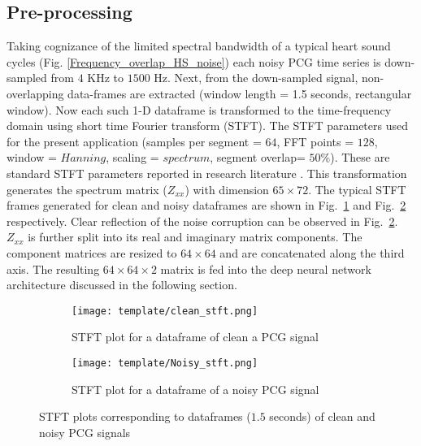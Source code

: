 \documentclass[sigconf,screen]{acmart}
\begin{document}
\subsection{Pre-processing}
Taking cognizance of the limited spectral bandwidth of a typical heart sound cycles (Fig. \ref{Frequency_overlap_HS_noise}) each noisy PCG time series is down-sampled from $4$ KHz to $1500$ Hz. Next, from the down-sampled signal, non-overlapping data-frames are extracted (window length = 1.5 seconds, rectangular window). Now each such 1-D dataframe is transformed to the time-frequency domain using short time Fourier transform (STFT). The STFT parameters used for the present application (samples per segment = $64$, FFT points = $128$, window = $Hanning$, scaling  = $spectrum$, segment overlap= $50\%$). These are standard STFT parameters reported in research literature \cite{grais2017two}.  This transformation generates the spectrum matrix ($Z_{xx}$) with dimension $65\times72$. The typical STFT frames generated for clean and noisy dataframes are shown in Fig.~\ref{fig:clean_stft.png} and Fig.~\ref{fig:Noisy_stft.png} respectively. Clear reflection of the noise corruption can be observed in Fig.~\ref{fig:Noisy_stft.png}. $Z_{xx}$ is further split into its real and imaginary matrix components. The component matrices are resized to $64\times64$  and are concatenated along the third axis. The resulting $64\times64\times2$ matrix is fed into the deep neural network architecture discussed in the following section. 
\begin{figure}
	\begin{subfigure}{.45\textwidth}
		\centering
		\texttt{[image: template/clean\_stft.png]}
		\caption{STFT plot for a dataframe of clean a PCG signal}
		\label{fig:clean_stft.png}
	\end{subfigure}
	\begin{subfigure}{.45\textwidth}
		\centering
		\texttt{[image: template/Noisy\_stft.png]}
		\caption{STFT plot for a dataframe of a noisy PCG signal}
		\label{fig:Noisy_stft.png}
	\end{subfigure}
	\caption{STFT plots corresponding to dataframes ($1.5$ seconds) of clean and noisy PCG signals}
	\label{fig:typical clean and noisy STFT}
\end{figure}
\end{document}
